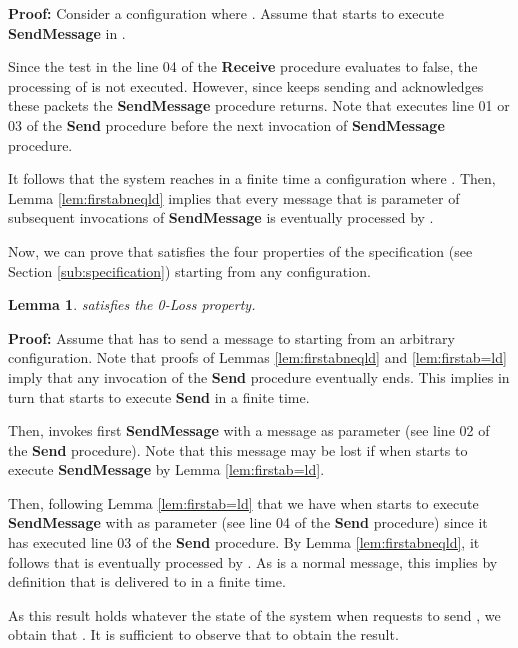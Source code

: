 \documentclass[11pt]{article}
\newtheorem{lemma}{Lemma}
\newenvironment{proof}{\noindent\textbf{Proof:}}{\hfill}
\begin{document}
\begin{proof}
Consider a configuration  where . Assume that  starts to execute \textbf{SendMessage}  in .

Since the test in the line 04 of the \textbf{Receive} procedure evaluates to false, the processing of  is not executed. However, since  keeps sending  and  acknowledges these packets the \textbf{SendMessage} procedure returns. Note that  executes line 01 or 03 of the \textbf{Send} procedure before the next invocation of \textbf{SendMessage} procedure.
 
It follows that the system reaches in a finite time a configuration where . Then, Lemma \ref{lem:firstabneqld} implies that every message that is parameter of subsequent invocations of \textbf{SendMessage} is eventually processed by . 
\end{proof}

Now, we can prove that  satisfies the four properties of the specification (see Section \ref{sub:specification}) starting from any configuration.

\begin{lemma}\label{lem:loss}
 satisfies the 0-Loss property.
\end{lemma}

\begin{proof}
Assume that  has to send a message  to  starting from an arbitrary configuration. Note that proofs of Lemmas \ref{lem:firstabneqld} and \ref{lem:firstab=ld} imply that any invocation of the \textbf{Send} procedure eventually ends. This implies in turn that  starts to execute \textbf{Send} in a finite time. 

Then,  invokes first \textbf{SendMessage} with a  message as parameter (see line 02 of the \textbf{Send} procedure). Note that this  message may be lost if  when  starts to execute \textbf{SendMessage} by Lemma \ref{lem:firstab=ld}. 

Then, following Lemma \ref{lem:firstab=ld} that we have  when  starts to execute \textbf{SendMessage} with  as parameter (see line 04 of the \textbf{Send} procedure) since it has executed line 03 of the \textbf{Send} procedure. By Lemma \ref{lem:firstabneqld}, it follows that  is eventually processed by . As  is a normal message, this implies by definition that  is delivered to  in a finite time.

As this result holds whatever the state of the system when  requests to send , we obtain that . It is sufficient to observe that  to obtain the result.
\end{proof}
\end{document}
